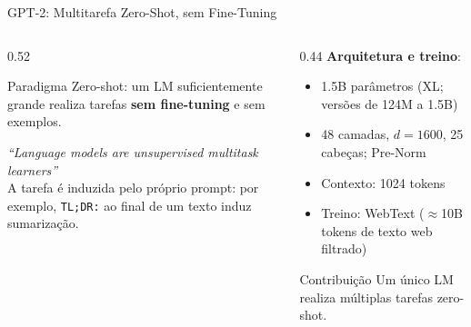\documentclass[aspectratio=169, xcolor=dvipsnames]{beamer}
\begin{document}
  \begin{frame}{GPT-2: Multitarefa Zero-Shot, sem Fine-Tuning\footnotemark[1]}
    \begin{columns}[T]
      \begin{column}{0.52\textwidth}
        \begin{block}{Paradigma}
          Zero-shot: um LM suficientemente grande realiza tarefas \textbf{sem fine-tuning} e sem exemplos.
        \end{block}
        \vspace{0.3em}
        \textit{``Language models are unsupervised multitask learners''}\\[0.4em]
        A tarefa é induzida pelo próprio prompt: por exemplo, \texttt{TL;DR:} ao final de um texto induz sumarização.
      \end{column}
      \begin{column}{0.44\textwidth}
        \textbf{Arquitetura e treino}:
        \begin{itemize}
          \item 1.5B parâmetros (XL; versões de 124M a 1.5B)
          \item 48 camadas, $d=1600$, 25 cabeças; Pre-Norm
          \item Contexto: 1024 tokens
          \item Treino: WebText ($\approx$10B tokens de texto web filtrado)
        \end{itemize}
        \vspace{0.3em}
        \begin{exampleblock}{Contribuição}
          Um único LM realiza múltiplas tarefas zero-shot.
        \end{exampleblock}
      \end{column}
    \end{columns}
  \end{frame}
\end{document}
